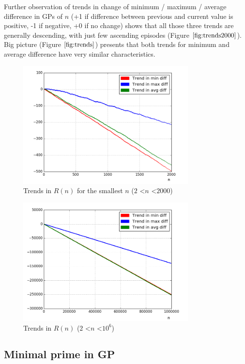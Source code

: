 \documentclass[10pt,twocolumn]{article}
\begin{document}
Further observation of trends in change of minimum / maximum / average difference in GPs of $n$ (+1 if difference between previous and current value is positive, -1 if negative, +0 if no change) shows that all those three trends are generally descending, with just few ascending episodes (Figure $\ref{fig:trends2000}$). Big picture (Figure $\ref{fig:trends}$) presents that both trends for minimum and average difference have very similar characteristics. 

\begin{figure}[ht]
\centering
\includegraphics[width=9cm]{f_trends_2000_pairs}
\caption{Trends in $R(n)$ for the smallest $n$ ($2$ \textless $n$ \textless $2000$)}
\label{fig:trends2000}
\end{figure}

\begin{figure}[!ht]
\centering
\includegraphics[width=9cm]{f_trends_pairs}
\caption{Trends in $R(n)$ ($2$ \textless $n$ \textless $10^6$)}
\label{fig:trends}
\end{figure}

\subsection{Minimal prime in GP}
\end{document}
